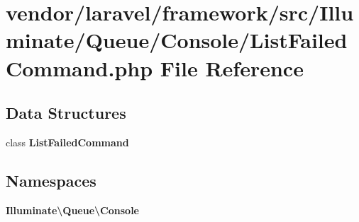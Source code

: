 \section{vendor/laravel/framework/src/\+Illuminate/\+Queue/\+Console/\+List\+Failed\+Command.php File Reference}
\label{_list_failed_command_8php}
\subsection*{Data Structures}
\begin{DoxyCompactItemize}
\item 
class {\bf List\+Failed\+Command}
\end{DoxyCompactItemize}
\subsection*{Namespaces}
\begin{DoxyCompactItemize}
\item 
 {\bf Illuminate\textbackslash{}\+Queue\textbackslash{}\+Console}
\end{DoxyCompactItemize}
